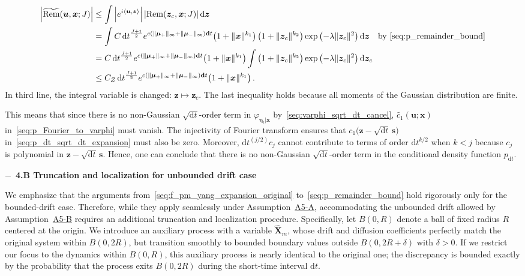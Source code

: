 \begin{equation*}
\begin{aligned}
    \left|\widetilde{\mathrm{Rem}}(\bm u,\bm x;J)\right|
    &\leq\int\left|e^{i\langle\bm u,\bm z\rangle}\right|
    \left|\mathrm{Rem}\!\left(\bm z_c,\bm x;J\right)\right|\mathrm d\bm z
    \\
    &=\int C\,\mathrm dt^{\frac{J+1}{2}}
    e^{c\left(\|\bm\mu_+\|_\infty+\|\bm\mu_-\|_\infty\right)\mathbf dt}
    \!\left(1+\|\bm x\|^{k_1}\right)
    \big(1+\|\bm z_c\|^{k_2}\big)
    \exp\left(-\lambda\|\bm z_c\|^2\right)\mathrm d\bm z
    \quad\text{by~\eqref{seq:p_remainder_bound}}
    \\
    &=C\,\mathrm dt^{\frac{J+1}{2}}
    e^{c\left(\|\bm\mu_+\|_\infty+\|\bm\mu_-\|_\infty\right)\mathbf dt}
    \!\left(1+\|\bm x\|^{k_1}\right)
    \int\big(1+\|\bm z_c\|^{k_2}\big)\exp\left(-\lambda\|\bm z_c\|^2\right)\mathrm d\bm z_c
    \\
    &\leq C_Z\,\mathrm dt^{\frac{J+1}{2}}
    e^{c\left(\|\bm\mu_+\|_\infty+\|\bm\mu_-\|_\infty\right)\mathbf dt}
    \!\left(1+\|\bm x\|^{k_1}\right).
\end{aligned}
\end{equation*}
In third line, the integral variable is changed: $\bm z\mapsto\bm z_c$.
The last inequality holds because all moments of the Gaussian distribution are finite.

This means that since there is no non-Gaussian $\sqrt{\mathrm dt}$-order term in $\varphi_{\bm\eta_t|\bm x}$ by~\eqref{seq:varphi_sqrt_dt_cancel}, $\widetilde{c_1}(\bm u;\bm x)$ in~\eqref{seq:p_Fourier_to_varphi} must vanish. The injectivity of Fourier transform ensures that $c_1\big(\bm z-\sqrt{\mathrm dt}\,\bm s\big)$ in~\eqref{seq:p_dt_sqrt_dt_expansion} must also be zero. Moreover, $\mathrm dt^{(j/2)}c_j$ cannot contribute to terms of order $\mathrm dt^{k/2}$ when $k<j$ because $c_j$ is polynomial in $\bm z-\sqrt{\mathrm dt}\,\bm s$. Hence, one can conclude that there is no non-Gaussian $\sqrt{\mathrm dt}$-order term in the conditional density function $p_{\mathrm dt}$. 

\medskip
\noindent$-$\ \textbf{4.B Truncation and localization for unbounded drift case} 

We emphasize that the arguments from~\eqref{seq:f_pm_yang_expansion_original} to~\eqref{seq:p_remainder_bound} hold rigorously only for the bounded-drift case. Therefore, while they apply seamlessly under Assumption~\hyperlink{assumption:A5-A}{A5-A}, accommodating the unbounded drift allowed by Assumption~\hyperlink{assumption:A5-B}{A5-B} requires an additional truncation and localization procedure. 
Specifically, let $B(0,R)$ denote a ball of fixed radius $R$ centered at the origin. We introduce an auxiliary process with a variable $\hat{\bm X}_m$, whose drift and diffusion coefficients perfectly match the original system within $B(0,2R)$, but transition smoothly to bounded boundary values outside $B(0,2R+\delta)$ with $\delta>0$. If we restrict our focus to the dynamics within $B(0,R)$, this auxiliary process is nearly identical to the original one; the discrepancy is bounded exactly by the probability that the process exits $B(0,2R)$ during the short-time interval $\mathrm dt$. 

